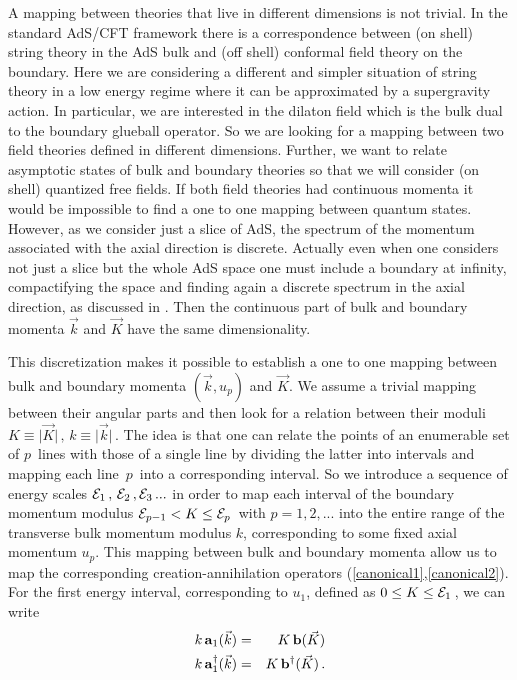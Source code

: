 \documentclass[a4paper,twocolumn,prd,groupedaddress,nofootinbib]{revtex4}
\begin{document}
A mapping between theories that live in different dimensions is not 
trivial. 
In the standard AdS/CFT framework there is a correspondence between  
(on shell) string theory in the AdS bulk and 
(off shell) conformal field theory on the boundary. 
Here we are considering a different and simpler situation of 
string theory in a low energy regime where it can be approximated 
by a supergravity action. 
In particular, we are interested in the dilaton field which 
is the bulk dual to the boundary glueball operator. 
So we are looking for a mapping between two field 
theories defined in different dimensions. 
Further, we want to relate asymptotic states of bulk and boundary 
theories so that we will consider (on shell) quantized free fields. 
If both field theories had continuous momenta it would be impossible
to find a one to one mapping between quantum states. 
However, as we consider just a slice of AdS, 
the spectrum of the momentum associated with the axial 
direction is discrete. 
Actually even when one considers not just a slice but the whole AdS 
space one must include a boundary at infinity, compactifying the space 
and finding again a discrete spectrum in the axial direction, 
as discussed in \cite{BB1}.
Then the continuous part of bulk and boundary momenta 
$\vec k$ and $\vec K$ have the same dimensionality. 

This discretization makes it possible to establish 
a one to one mapping between bulk
and boundary momenta $(\vec k , u_p)$ and $\vec K$. 
We assume a trivial mapping between their angular parts
and then look for a relation between  their moduli
$K \equiv \vert \vec K \vert \, , \,k \equiv \vert \vec k \vert \,$.
The idea is that one can relate the points of an enumerable set of 
$p\,$ lines with those of a single line by dividing the latter into 
intervals and mapping each line $\,p\,$ into a corresponding interval.
So we introduce a sequence of energy scales ${\cal E}_1 \,,\,
{\cal E}_2\,,{\cal E}_3\,...$ 
in order to map each interval of the boundary momentum modulus
${\cal E}_{p-1} < K \le {\cal E}_p \,$ with $p=1,2,...$  
into the entire range of the transverse bulk momentum modulus $ k$,  
corresponding to some fixed axial momentum $u_p$. 
This mapping between bulk and boundary momenta allow us to
map the corresponding creation-annihilation operators 
(\ref{canonical1},\ref{canonical2}).
For the first energy interval, corresponding to $u_1$,  defined as 
$0 \le K \le {\cal E}_1\,$, we can write\cite{BB2} 
\begin{eqnarray}
\label{ab}
k\,{\bf a}_1 ( \vec  k ) 
&=& K \,{\bf b}( \vec K  ) \nonumber\\
k\,{\bf a}^\dagger_1 ( \vec k ) 
&=& K\,{\bf b}^\dagger ( \vec K  )\,.
\end{eqnarray}
\end{document}
